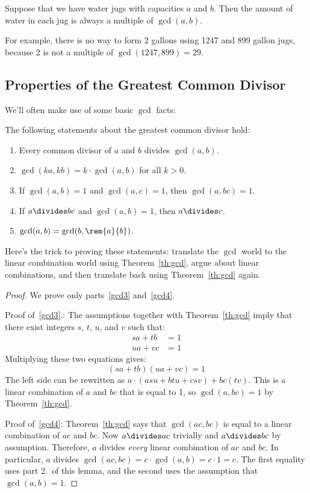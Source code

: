 \begin{corollary}
\label{cor:waterjugs}
Suppose that we have water jugs with capacities $a$ and $b$.  Then the
amount of water in each jug is always a multiple of $\gcd(a, b)$.
\end{corollary}

For example, there is no way to form 2 gallons using 1247 and 899 gallon
jugs, because 2 is not a multiple of $\gcd(1247, 899) = 29$.


\subsection{Properties of the Greatest Common Divisor}

We'll often make use of some basic $\gcd$ facts:

\begin{lemma} The following statements about the greatest common divisor hold:
\label{lem:gcd}
%
\begin{enumerate}
\item Every common divisor of $a$ and $b$ divides $\gcd(a, b)$.
\item $\gcd(k a, k b) = k \cdot \gcd(a, b)$ for all $k > 0$.
\item\label{gcd3} If $\gcd(a, b) = 1$ and $\gcd(a, c) = 1$, then $\gcd(a, bc) =
1$.
\item\label{gcd4} If $a \divides b c$ and $\gcd(a, b) = 1$, then $a \divides c$.
\item\label{gcd5} $\gcd(a, b) = \gcd(b, \rem{a}{b})$.
\end{enumerate}
\end{lemma}

Here's the trick to proving these statements: translate the $\gcd$
world to the linear combination world using Theorem~\ref{th:gcd},
argue about linear combinations, and then translate back using
Theorem~\ref{th:gcd} again.

\begin{proof}
We prove only parts~\ref{gcd3} and~\ref{gcd4}.

Proof of~\ref{gcd3}.: The assumptions together with Theorem~\ref{th:gcd} imply
that there exist integers $s$, $t$, $u$, and $v$ such that:
%
\begin{align*}
s a + t b & = 1 \\
u a + v c & = 1
\end{align*}
%
Multiplying these two equations gives:
\[
(s a + t b)(u a + v c) = 1
\]
%
The left side can be rewritten as $a \cdot (a s u + b t u + c s v) + b c
(t v)$.  This is a linear combination of $a$ and $b c$ that is equal to 1,
so $\gcd(a, bc) = 1$ by Theorem~\ref{th:gcd}.

Proof of~\ref{gcd4}: Theorem~\ref{th:gcd} says that $\gcd(ac, bc)$ is equal to a
linear combination of $ac$ and $bc$.  Now $a \divides ac$ trivially and $a
\divides bc$ by assumption.  Therefore, $a$ divides \emph{every} linear
combination of $ac$ and $bc$.  In particular, $a$ divides $\gcd(ac, bc) =
c \cdot \gcd(a, b) = c\cdot 1 = c$.  The first equality uses part 2.\ of
this lemma, and the second uses the assumption that $\gcd(a, b) = 1$.
\end{proof}

